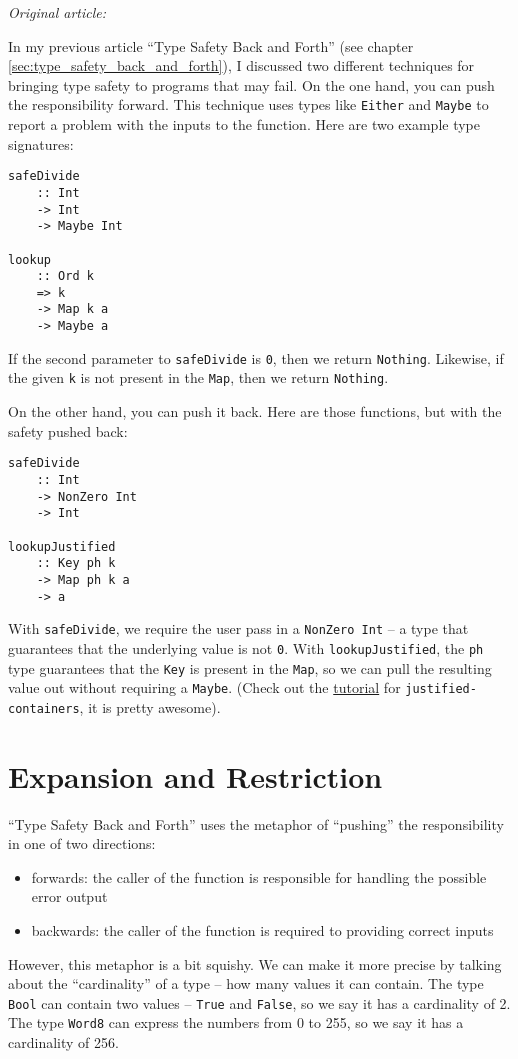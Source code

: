\textit{Original article: \cite{keep_your_types_small}}

\vspace{\baselineskip}

\noindent In my previous article ``Type Safety Back and Forth'' (see chapter \ref{sec:type_safety_back_and_forth}), I discussed two different techniques for bringing type safety to programs that may fail. On the one hand, you can push the responsibility forward. This technique uses types like \texttt{Either} and \texttt{Maybe} to report a problem with the inputs to the function. Here are two example type signatures:

\begin{verbatim}
safeDivide
    :: Int
    -> Int
    -> Maybe Int

lookup
    :: Ord k
    => k
    -> Map k a
    -> Maybe a
\end{verbatim}
If the second parameter to \texttt{safeDivide} is \texttt{0}, then we return \texttt{Nothing}. Likewise, if the given \texttt{k} is not present in the \texttt{Map}, then we return \texttt{Nothing}.

On the other hand, you can push it back. Here are those functions, but with the safety pushed back:

\begin{verbatim}
safeDivide
    :: Int
    -> NonZero Int
    -> Int

lookupJustified
    :: Key ph k
    -> Map ph k a
    -> a
\end{verbatim}
With \texttt{safeDivide}, we require the user pass in a \texttt{NonZero Int} -- a type that guarantees that the underlying value is not \texttt{0}. With \texttt{lookupJustified}, the \texttt{ph} type guarantees that the \texttt{Key} is present in the \texttt{Map}, so we can pull the resulting value out without requiring a \texttt{Maybe}. (Check out the \href{https://hackage.haskell.org/package/justified-containers-0.3.0.0/docs/Data-Map-Justified-Tutorial.html}{tutorial} for \texttt{justified-containers}, it is pretty awesome).




\section{Expansion and Restriction}


``Type Safety Back and Forth'' uses the metaphor of ``pushing'' the responsibility in one of two directions:

\begin{itemize}
\item forwards: the caller of the function is responsible for handling the possible error output
\item backwards: the caller of the function is required to providing correct inputs
\end{itemize}
However, this metaphor is a bit squishy. We can make it more precise by talking about the ``cardinality'' of a type -- how many values it can contain. The type \texttt{Bool} can contain two values -- \texttt{True} and \texttt{False}, so we say it has a cardinality of 2. The type \texttt{Word8} can express the numbers from 0 to 255, so we say it has a cardinality of 256.

